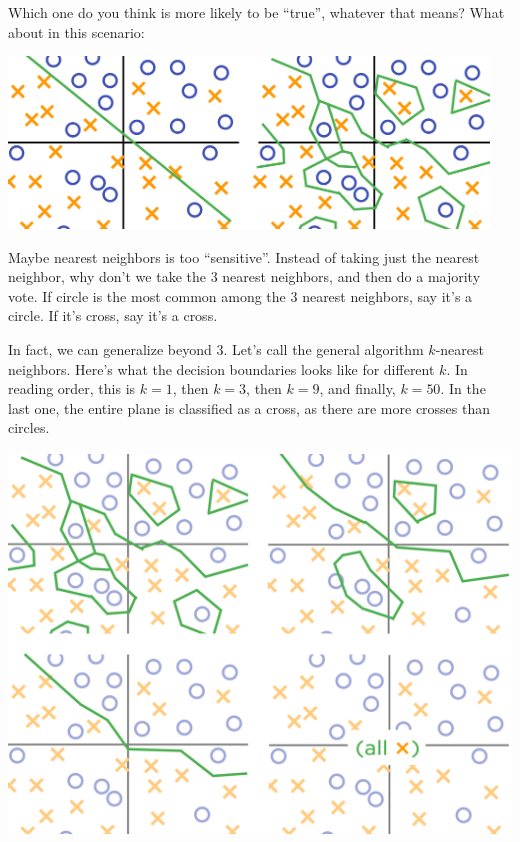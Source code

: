 \documentclass[11pt,paper=letter]{scrartcl}
\begin{document}
Which one do you think is more likely to be ``true'', whatever that means? What about in this scenario:

\begin{center}
\includegraphics[height=1.8in]{5.png}
\end{center}

Maybe nearest neighbors is too ``sensitive''. Instead of taking just the nearest neighbor, why don't we take the $3$ nearest neighbors, and then do a majority vote. If circle is the most common among the $3$ nearest neighbors, say it's a circle. If it's cross, say it's a cross.

In fact, we can generalize beyond $3$. Let's call the general algorithm $k$-nearest neighbors. Here's what the decision boundaries looks like for different $k$. In reading order, this is $k = 1$, then $k = 3$, then $k = 9$, and finally, $k = 50$. In the last one, the entire plane is classified as a cross, as there are more crosses than circles.

\begin{center}
\includegraphics[height=4in]{6.png}
\end{center}
\end{document}
